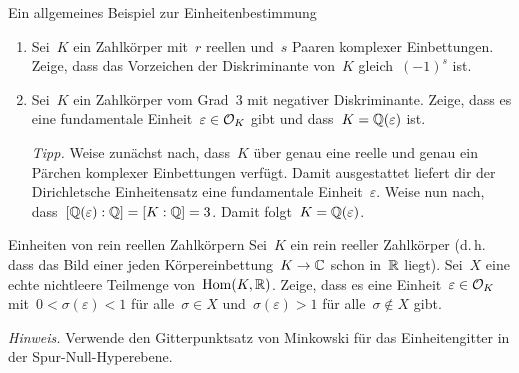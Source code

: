 \documentclass{uebblatt}
\begin{document}
\begin{aufgabe}{Ein allgemeines Beispiel zur Einheitenbestimmung}
\begin{enumerate}
\item Sei~$K$ ein Zahlkörper mit~$r$ reellen und~$s$ Paaren komplexer
Einbettungen. Zeige, dass das Vorzeichen der Diskriminante von~$K$
gleich~$(-1)^s$ ist.
\item Sei~$K$ ein Zahlkörper vom Grad~3 mit negativer Diskriminante. Zeige,
dass es eine fundamentale Einheit~$\varepsilon \in \mathcal{O}_K$ gibt und dass~$K =
\mathbb{Q}(\varepsilon)$ ist.

{\tiny\emph{Tipp.} Weise zunächst nach, dass~$K$ über genau eine reelle und
genau ein Pärchen komplexer Einbettungen verfügt. Damit ausgestattet liefert
dir der Dirichletsche Einheitensatz eine fundamentale Einheit~$\varepsilon$.
Weise nun nach, dass~$[\mathbb{Q}(\varepsilon) : \mathbb{Q}] = [K : \mathbb{Q}] = 3$. Damit folgt~$K
= \mathbb{Q}(\varepsilon)$.\par}
\end{enumerate}
\end{aufgabe}

\begin{aufgabe}{Einheiten von rein reellen Zahlkörpern}
Sei~$K$ ein rein reeller Zahlkörper (d.\,h. dass das Bild einer jeden
Körpereinbettung~$K \to \mathbb{C}$ schon in~$\mathbb{R}$ liegt). Sei~$X$ eine echte
nichtleere Teilmenge von~$\mathrm{Hom}(K, \mathbb{R})$. Zeige, dass es eine
Einheit~$\varepsilon \in \mathcal{O}_K$ mit~$0 < \sigma(\varepsilon) < 1$ für alle~$\sigma \in X$
und~$\sigma(\varepsilon) > 1$ für alle~$\sigma \not\in X$ gibt.

{\tiny\emph{Hinweis.} Verwende den Gitterpunktsatz von Minkowski für das
Einheitengitter in der Spur-Null-Hyperebene.\par}
\end{aufgabe}
\end{document}

